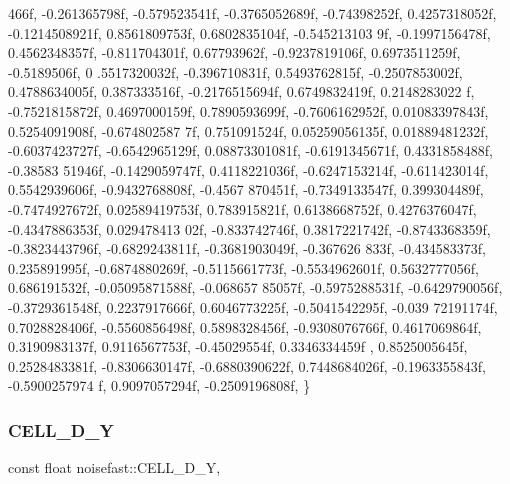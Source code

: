 \begin{DoxyCode}
      466f, -0.261365798f, -0.579523541f,
    -0.3765052689f, -0.74398252f, 0.4257318052f, -0.1214508921f, 0.8561809753f, 0.6802835104f, -0.545213103
      9f, -0.1997156478f, 0.4562348357f, -0.811704301f, 0.67793962f, -0.9237819106f, 0.6973511259f, -0.5189506f, 0
      .5517320032f, -0.396710831f,
    0.5493762815f, -0.2507853002f, 0.4788634005f, 0.387333516f, -0.2176515694f, 0.6749832419f, 0.2148283022
      f, -0.7521815872f, 0.4697000159f, 0.7890593699f, -0.7606162952f, 0.01083397843f, 0.5254091908f, -0.674802587
      7f, 0.751091524f, 0.05259056135f,
    0.01889481232f, -0.6037423727f, -0.6542965129f, 0.08873301081f, -0.6191345671f, 0.4331858488f, -0.38583
      51946f, -0.1429059747f, 0.4118221036f, -0.6247153214f, -0.611423014f, 0.5542939606f, -0.9432768808f, -0.4567
      870451f, -0.7349133547f, 0.399304489f,
    -0.7474927672f, 0.02589419753f, 0.783915821f, 0.6138668752f, 0.4276376047f, -0.4347886353f, 0.029478413
      02f, -0.833742746f, 0.3817221742f, -0.8743368359f, -0.3823443796f, -0.6829243811f, -0.3681903049f, -0.367626
      833f, -0.434583373f, 0.235891995f,
    -0.6874880269f, -0.5115661773f, -0.5534962601f, 0.5632777056f, 0.686191532f, -0.05095871588f, -0.068657
      85057f, -0.5975288531f, -0.6429790056f, -0.3729361548f, 0.2237917666f, 0.6046773225f, -0.5041542295f, -0.039
      72191174f, 0.7028828406f, -0.5560856498f,
    0.5898328456f, -0.9308076766f, 0.4617069864f, 0.3190983137f, 0.9116567753f, -0.45029554f, 0.3346334459f
      , 0.8525005645f, 0.2528483381f, -0.8306630147f, -0.6880390622f, 0.7448684026f, -0.1963355843f, -0.5900257974
      f, 0.9097057294f, -0.2509196808f,
\}
\end{DoxyCode}
\mbox{\label{classnoisefast_a3c89edb98c291279310e131f329552c8}} 
\subsubsection{\texorpdfstring{C\+E\+L\+L\+\_\+D\+\_\+Y}{CELL\_3D\_Y}}
{\footnotesize\ttfamily const float noisefast\+::\+C\+E\+L\+L\+\_\+D\+\_\+Y\hspace{0.3cm}{\ttfamily [static]}, {\ttfamily [private]}}

